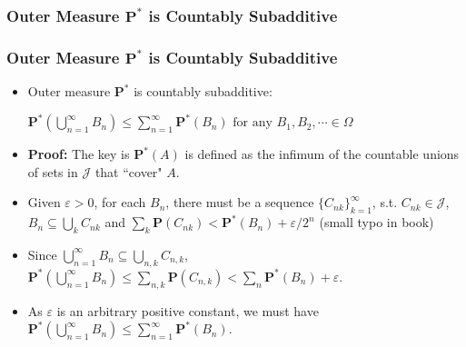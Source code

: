 \documentclass[%
]{beamer}
\newcommand{\BP}{\mathbf{P}}
\begin{document}
\subsubsection{Outer Measure $\BP^*$ is Countably Subadditive}
\frame
{
  \frametitle{Outer Measure $\BP^*$ is Countably Subadditive}

   \begin{itemize}

            \item<1->   [] \begin{Lemma}[2.3.6.] Outer measure $\BP^*$ is countably subadditive:  
            
            $\BP^*(\bigcup_{n=1}^{\infty} B_n)\leq \sum_{n=1}^{\infty} \BP^* (B_n) \text{ for any }B_1, B_2,\cdots \in \Omega$
               \end{Lemma}    
       
              \item<2-> []\textbf{Proof:} The key is $\BP^* (A)$ is defined as the infimum of the countable unions of sets in $\mathcal{J}$ that ``cover" $A$.
             \item<3-> [1)] Given $\varepsilon>0$, for each $B_n$, there must be a sequence $\{C_{nk}\}_{k=1}^{\infty}$, s.t. $C_{nk}\in \mathcal{J}$, $B_n \subseteq \bigcup_k  C_{nk}$ and $\sum_k \BP(C_{nk}) < \BP^* (B_n)+\varepsilon/2^n$ (small typo in book)
               \item<4-> [2)] Since $\bigcup_{n=1}^{\infty} B_n \subseteq \bigcup_{n, k} C_{n,k}$, $\BP^*(\bigcup_{n=1}^{\infty} B_n) \leq \sum_{n, k} \BP(C_{n,k}) <  \sum_n \BP^* (B_n)+\varepsilon$. 
                \item<4-> [3)] As $\varepsilon$ is an arbitrary positive constant, we must have $\BP^*(\bigcup_{n=1}^{\infty} B_n)\leq \sum_{n=1}^{\infty} \BP^* (B_n) $.
    
                 \end{itemize}
}
\end{document}

